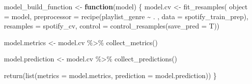 \documentclass[
]{article}
\newenvironment{Shaded}{\begin{snugshade}}{\end{snugshade}}
\newcommand{\AttributeTok}[1]{\textcolor[rgb]{0.77,0.63,0.00}{#1}}
\newcommand{\ControlFlowTok}[1]{\textcolor[rgb]{0.13,0.29,0.53}{\textbf{#1}}}
\newcommand{\FunctionTok}[1]{\textcolor[rgb]{0.00,0.00,0.00}{#1}}
\newcommand{\NormalTok}[1]{#1}
\newcommand{\OtherTok}[1]{\textcolor[rgb]{0.56,0.35,0.01}{#1}}
\newcommand{\SpecialCharTok}[1]{\textcolor[rgb]{0.00,0.00,0.00}{#1}}
\begin{document}
\begin{Shaded}
\begin{Highlighting}[]
\NormalTok{model\_build\_function }\OtherTok{\textless{}{-}} \ControlFlowTok{function}\NormalTok{(model) \{}
\NormalTok{  model.cv }\OtherTok{\textless{}{-}} \FunctionTok{fit\_resamples}\NormalTok{(  }
    \AttributeTok{object =}\NormalTok{ model,}
    \AttributeTok{preprocessor =} \FunctionTok{recipe}\NormalTok{(playlist\_genre }\SpecialCharTok{\textasciitilde{}}\NormalTok{ . , }
                          \AttributeTok{data =}\NormalTok{ spotify\_train\_prep),}
    \AttributeTok{resamples =}\NormalTok{ spotify\_cv, }
    \AttributeTok{control =} \FunctionTok{control\_resamples}\NormalTok{(}\AttributeTok{save\_pred =}\NormalTok{ T))}
  
\NormalTok{  model.metrics }\OtherTok{\textless{}{-}}\NormalTok{ model.cv }\SpecialCharTok{\%\textgreater{}\%} 
    \FunctionTok{collect\_metrics}\NormalTok{()}
  
\NormalTok{  model.prediction }\OtherTok{\textless{}{-}}\NormalTok{ model.cv }\SpecialCharTok{\%\textgreater{}\%} 
    \FunctionTok{collect\_predictions}\NormalTok{()}
  
  \FunctionTok{return}\NormalTok{(}\FunctionTok{list}\NormalTok{(}\AttributeTok{metrics =}\NormalTok{ model.metrics, }\AttributeTok{prediction =}\NormalTok{ model.prediction))}
\NormalTok{\}}
\end{Highlighting}
\end{Shaded}
\end{document}
